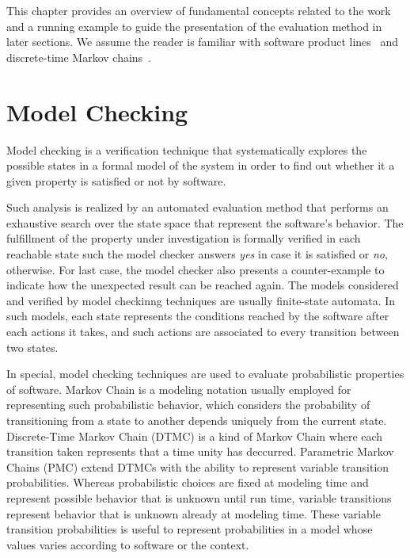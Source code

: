 
This chapter provides an overview of fundamental concepts related to the work
and a running example to guide the presentation of the evaluation method in
later sections.  We assume the reader is familiar with software product
lines~\cite{clements_software_2002,pohl_software_2010} and discrete-time Markov
chains~\cite{baier_principles_2008}.


\section{Model Checking \label{sec:modelChecking}}

Model checking is a verification technique that systematically explores the
possible states in a formal model of the system in order to find out whether it
a given property is satisfied or not by software\cite{baier_principles_2008}.

Such analysis is realized by an automated evaluation method that performs an
exhaustive search over the state space that represent the software's behavior.
The fulfillment of the  property under investigation is formally verified in
each reachable state such the model checker answers \emph{yes} in case it is
satisfied or \emph{no}, otherwise. For last case, the model checker also
presents a counter-example to indicate how the unexpected result can be reached
again\cite{baier_principles_2008}. 
The models considered and verified by model checkinng techniques are usually
finite-state automata. In such models, each state represents the conditions
reached by the software after each actions it takes, and such actions are
associated to every transition between two states. 

In special, model checking techniques are used to evaluate probabilistic
properties of software. Markov Chain is a modeling notation usually employed for
representing such probabilistic behavior, which considers the probability of
transitioning from a state to another depends uniquely from the current state.
Discrete-Time Markov Chain (DTMC) is a kind of Markov Chain where each
transition taken represents that a time unity has deccurred.  Parametric Markov
Chains (PMC) extend DTMCs with the ability to represent variable transition
probabilities. Whereas probabilistic choices are fixed at modeling time and
represent possible behavior that is unknown until run time, variable transitions
represent behavior that is unknown already at modeling time. These variable
transition probabilities is useful to represent probabilities in a model whose
values varies according to software or the context\cite{ghezzi_model-based_2013,
rodrigues_modeling_2015}. 



